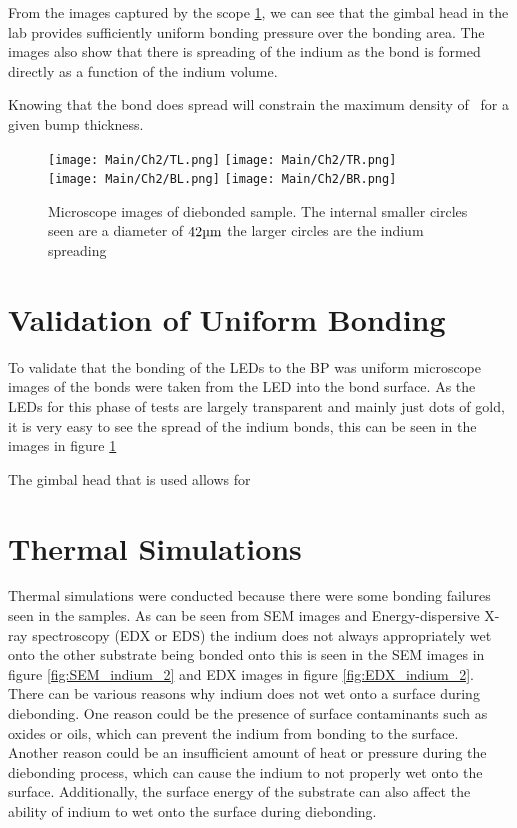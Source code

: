 From the images captured by the scope \ref{fig:microscopeIndium}, we can see that the gimbal head in the lab provides sufficiently uniform bonding pressure over the bonding area. The images also show that there is spreading of the indium as the bond is formed directly as a function of the indium volume.

Knowing that the bond does spread will constrain the maximum density of \uleds \ for a given bump thickness.

\begin{figure}
    \centering
    \texttt{[image: Main/Ch2/TL.png]}
    \texttt{[image: Main/Ch2/TR.png]} \\
    \texttt{[image: Main/Ch2/BL.png]}
    \texttt{[image: Main/Ch2/BR.png]}
    \caption{Microscope images of diebonded sample. The internal smaller circles seen are a diameter of $42 \um$ the larger circles are the indium spreading}
    \label{fig:microscopeIndium}
\end{figure}

\section{Validation of Uniform Bonding}
\label{sec:uniformBond}
To validate that the bonding of the LEDs to the BP was uniform microscope images of the bonds were taken from the LED into the bond surface. As the LEDs for this phase of tests are largely transparent and mainly just dots of gold, it is very easy to see the spread of the indium bonds, this can be seen in the images in figure \ref{fig:microscopeIndium}

The gimbal head that is used %
allows for

\section{Thermal Simulations}

Thermal simulations were conducted because there were some bonding failures seen in the samples. As can be seen from SEM images and Energy-dispersive X-ray spectroscopy (EDX or EDS) the indium does not always appropriately wet onto the other substrate being bonded onto this is seen in the SEM images in figure
\ref{fig:SEM_indium_2} and EDX images in figure \ref{fig:EDX_indium_2}.
There can be various reasons why indium does not wet onto a surface during diebonding. One reason could be the presence of surface contaminants such as oxides or oils, which can prevent the indium from bonding to the surface. Another reason could be an insufficient amount of heat or pressure during the diebonding process, which can cause the indium to not properly wet onto the surface. Additionally, the surface energy of the substrate can also affect the ability of indium to wet onto the surface during diebonding.

